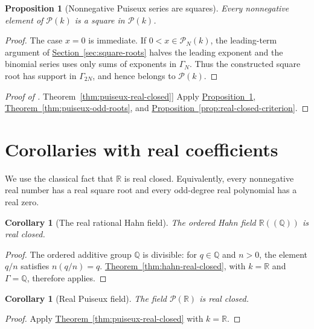 \documentclass[11pt]{article}
\newcommand{\Puiseux}{\mathcal P(k)}
\newcommand{\namedref}[2]{\hyperref[#2]{#1~\ref*{#2}}}
\theoremstyle{proofnote}
\newtheorem{proposition}[theorem]{Proposition}
\newtheorem{corollary}[theorem]{Corollary}
\begin{document}
\begin{proposition}[Nonnegative Puiseux series are squares]
\label{prop:puiseux-squares}
  Every nonnegative element of \(\Puiseux\) is a square in \(\Puiseux\).
\end{proposition}
\begin{proof}
  The case \(x=0\) is immediate.  If \(0<x\in\mathcal P_N(k)\), the leading-term argument of
  \namedref{Section}{sec:square-roots} halves the leading exponent and the
  binomial series uses only sums of exponents in \(\Gamma_N\).  Thus the
  constructed square root has support in
  \(\Gamma_{2N}\), and hence belongs to \(\Puiseux\).
\end{proof}

\begin{proof}[Proof of \namedref{Theorem}{thm:puiseux-real-closed}]
  Apply \namedref{Proposition}{prop:puiseux-squares},
  \namedref{Theorem}{thm:puiseux-odd-roots}, and
  \namedref{Proposition}{prop:real-closed-criterion}.
\end{proof}

\section{Corollaries with real coefficients}
\label{sec:real}

We use the classical fact that \(\mathbb R\) is real closed.  Equivalently,
every nonnegative real number has a real square root and every odd-degree
real polynomial has a real zero.

\begin{corollary}[The real rational Hahn field]
\label{cor:real-rational-hahn}
  The ordered Hahn field \(\mathbb R((\mathbb Q))\) is real closed.
\end{corollary}
\begin{proof}
  The ordered additive group \(\mathbb Q\) is divisible: for
  \(q\in\mathbb Q\) and \(n>0\), the element \(q/n\) satisfies
  \(n(q/n)=q\).  \namedref{Theorem}{thm:hahn-real-closed}, with
  \(k=\mathbb R\) and \(\Gamma=\mathbb Q\), therefore applies.
\end{proof}

\begin{corollary}[Real Puiseux field]
\label{cor:real-puiseux}
  The field \(\mathcal P(\mathbb R)\) is real closed.
\end{corollary}
\begin{proof}
  Apply \namedref{Theorem}{thm:puiseux-real-closed} with \(k=\mathbb R\).
\end{proof}
\end{document}
